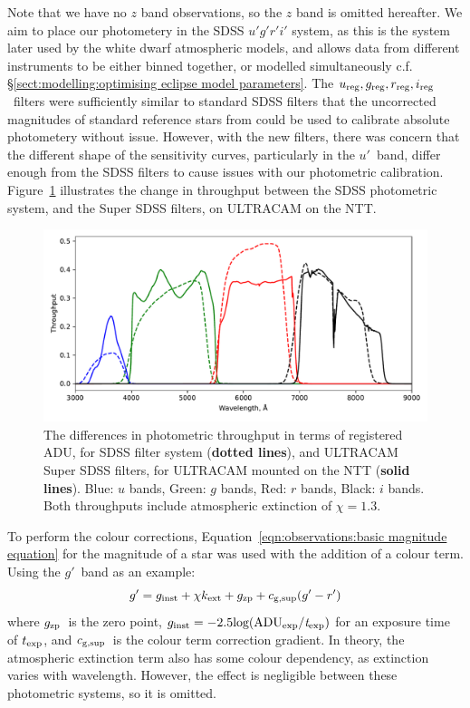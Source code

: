 Note that we have no $z$ band observations, so the $z$ band is omitted hereafter.
We aim to place our photometery in the SDSS $u'g'r'i'$ system, as this is the system later used by the white dwarf atmospheric models, and allows data from different instruments to be either binned together, or modelled simultaneously c.f. \S\ref{sect:modelling:optimising eclipse model parameters}. The $u_{\rm reg}, g_{\rm reg}, r_{\rm reg}, i_{\rm reg}$\ filters were sufficiently similar to standard SDSS filters that the uncorrected magnitudes of standard reference stars from \citet{smith2002} could be used to calibrate absolute photometery without issue. However, with the new filters, there was concern that the different shape of the sensitivity curves, particularly in the $u'$\ band, differ enough from the SDSS filters to cause issues with our photometric calibration. Figure~\ref{fig:sdss vs super filters} illustrates the change in throughput between the SDSS photometric system, and the Super SDSS filters, on ULTRACAM on the NTT.
\begin{figure}
    \centering
    \includegraphics[width=\columnwidth]{figures/three_cvs_with_weird_colours/GeneralFigs/bandpass_diffs_SDSS_dots_UCAMNTT_solid.pdf}
    \caption{The differences in photometric throughput in terms of registered ADU, for SDSS filter system ({\bf dotted lines}), and ULTRACAM Super SDSS filters, for ULTRACAM mounted on the NTT ({\bf solid lines}). Blue: $u$ bands, Green: $g$ bands, Red: $r$ bands, Black: $i$ bands. Both throughputs include atmospheric extinction of $\chi = 1.3$.}
    \label{fig:sdss vs super filters}
\end{figure}

To perform the colour corrections, Equation~\ref{eqn:observations:basic magnitude equation} for the magnitude of a star was used with the addition of a colour term. Using the $g'$\ band as an example:
\begin{equation}
    \label{eqn:observations:magnitude with colour term}
    g' = g_{\rm inst} + \chi k_{\rm ext} + g_{\rm zp} + c_{\rm g, sup}(g'-r')
\end{equation}
where $g_{\rm zp}$\ is the zero point, $g_{\rm inst} = -2.5 \rm log(ADU_{\rm exp}/{\it t}_{\rm exp})$
for an exposure time of $t_{\rm exp}$, and $c_{\rm g, sup}$\ is the colour term correction gradient. In theory, the atmospheric extinction term also has some colour dependency, as extinction varies with wavelength. However, the effect is negligible between these photometric systems, so it is omitted.

